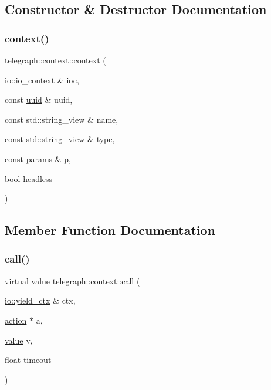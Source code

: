 \subsection{Constructor \& Destructor Documentation}
\mbox{\label{classtelegraph_1_1context_ad57ca6ff5da9ad653c688e7be3c0bbdc}} 
\subsubsection{\texorpdfstring{context()}{context()}}
{\footnotesize\ttfamily telegraph\+::context\+::context (\begin{DoxyParamCaption}\item[{io\+::io\+\_\+context \&}]{ioc,  }\item[{const \hyperlink{namespacetelegraph_a51ee91d7eaeef067f7ccac2b170e5d59}{uuid} \&}]{uuid,  }\item[{const std\+::string\+\_\+view \&}]{name,  }\item[{const std\+::string\+\_\+view \&}]{type,  }\item[{const \hyperlink{classtelegraph_1_1params}{params} \&}]{p,  }\item[{bool}]{headless }\end{DoxyParamCaption})\hspace{0.3cm}{\ttfamily [inline]}}



\subsection{Member Function Documentation}
\mbox{\label{classtelegraph_1_1context_a72da471eb635e5505b10d2f1103359ac}} 
\subsubsection{\texorpdfstring{call()}{call()}\hspace{0.1cm}{\footnotesize\ttfamily [1/2]}}
{\footnotesize\ttfamily virtual \hyperlink{classtelegraph_1_1value}{value} telegraph\+::context\+::call (\begin{DoxyParamCaption}\item[{\hyperlink{structboost_1_1asio_1_1yield__ctx}{io\+::yield\+\_\+ctx} \&}]{ctx,  }\item[{\hyperlink{classtelegraph_1_1action}{action} $\ast$}]{a,  }\item[{\hyperlink{classtelegraph_1_1value}{value}}]{v,  }\item[{float}]{timeout }\end{DoxyParamCaption})\hspace{0.3cm}{\ttfamily [pure virtual]}}



